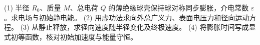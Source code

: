 (1) 半径 \(R_0\)、质量 \(M\)、总电荷 \(Q\) 的薄绝缘球壳保持球对称同步膨胀，介电常数 \(\varepsilon\)。求电场与初始静电能。
(2) 用虚功法求向外总广义力、表面电压力和径向运动方程。
(3) 从静止释放，求径向速度随半径变化及终极速度。
(4) 将膨胀时间写成显式初等函数，核对初始加速度与能量守恒。
